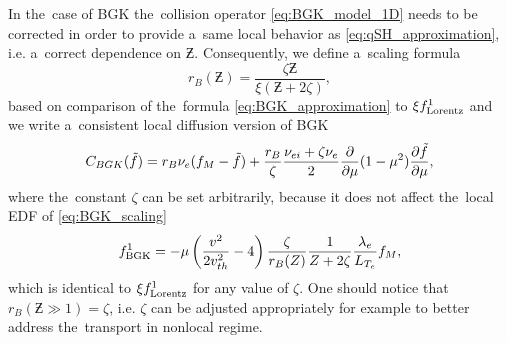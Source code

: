 In the~case of BGK the~collision operator \eqref{eq:BGK_model_1D} needs to be 
corrected in order to provide a~same local behavior as 
\eqref{eq:qSH_approximation}, i.e. a~correct dependence on 
$\Zbar$. Consequently, we define a~scaling formula 
\begin{equation}
  r_B(\Zbar) = \frac{\zeta\Zbar}{\xi(\Zbar + 2 \zeta)} ,
  \label{eq:BGK_r_scaling}
\end{equation}
based on comparison of the~formula \eqref{eq:BGK_approximation} to 
$\xi f^1_{\text{Lorentz}}$ and we write a~consistent local diffusion version
of BGK 
\begin{equation}
  C_{BGK}(\tilde{f})
  =
  r_B \nu_{e}(f_M - \tilde{f})
  + \frac{r_B}{\zeta}\frac{\nu_{ei} + \zeta\nu_{e}}{2}
  \frac{\partial{}}{\partial{\mu}}(1 - \mu^2)\frac{\partial{\tilde{f}}}{\partial{\mu}}
   ,
  \label{eq:BGK_scaling}
\end{equation}
where the~constant $\zeta$ can be set arbitrarily, because it does not affect 
the~local EDF of \eqref{eq:BGK_scaling}
\begin{equation}
  f^1_{\text{BGK}} = - \mu 
  \left( \frac{v^2}{2 v_{th}^2} - 4\right)\frac{\zeta}{r_B(Z)}
  \frac{1}{Z + 2\zeta}\frac{\lambda_e}{L_{T_e}}f_M
  ,
  \label{eq:f1BGK_approximation}
\end{equation}
which is identical to $\xi f^1_{\text{Lorentz}}$ for any value of $\zeta$.
One should notice that $r_B(\Zbar\gg1) = \zeta$, i.e. $\zeta$ can be adjusted 
appropriately for example to better address the~transport in nonlocal regime.

